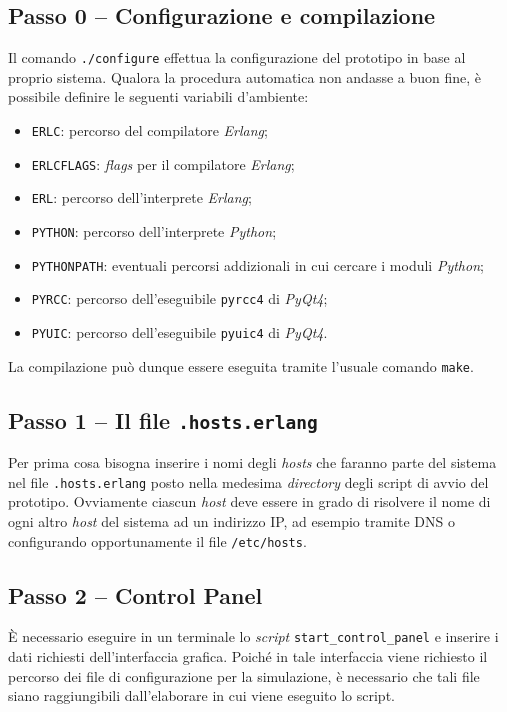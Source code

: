 \documentclass[a4paper]{report}
\newcommand{\Erlang}{\textsl{Erlang}}
\newcommand{\Python}{\textsl{Python}}
\begin{document}
\subsection*{Passo 0 -- Configurazione e compilazione}
Il comando \texttt{./configure} effettua la configurazione del prototipo in base al proprio sistema. Qualora la procedura automatica non andasse a buon fine, è possibile definire le seguenti variabili d'ambiente:
\begin{itemize}
\item \texttt{ERLC}: percorso del compilatore \Erlang{};
\item \texttt{ERLCFLAGS}: \textsl{flags} per il compilatore \Erlang{};
\item \texttt{ERL}: percorso dell'interprete \Erlang{};
\item \texttt{PYTHON}: percorso dell'interprete \Python{};
\item \texttt{PYTHONPATH}: eventuali percorsi addizionali in cui cercare i moduli \Python{};
\item \texttt{PYRCC}: percorso dell'eseguibile \texttt{pyrcc4} di \textsl{PyQt4};
\item \texttt{PYUIC}: percorso dell'eseguibile \texttt{pyuic4} di \textsl{PyQt4}.
\end{itemize}
La compilazione può dunque essere eseguita tramite l'usuale comando \texttt{make}.

\subsection*{Passo 1 -- Il file \texttt{.hosts.erlang}}
Per prima cosa bisogna inserire i nomi degli \textit{hosts} che faranno parte del sistema nel file \texttt{.hosts.erlang} posto nella medesima \textsl{directory} degli script di avvio del prototipo. Ovviamente ciascun \textit{host} deve essere in grado di risolvere il nome di ogni altro \textit{host} del sistema ad un indirizzo IP, ad esempio tramite DNS o configurando opportunamente il file \texttt{/etc/hosts}.

\subsection*{Passo 2 -- Control Panel}
\`E necessario eseguire in un terminale lo \textit{script} \texttt{start\_control\_panel} e inserire i dati richiesti dell'interfaccia grafica.
Poiché in tale interfaccia viene richiesto il percorso dei file di configurazione per la simulazione, è necessario che tali file siano raggiungibili dall'elaborare in cui viene eseguito lo script.
\end{document}
